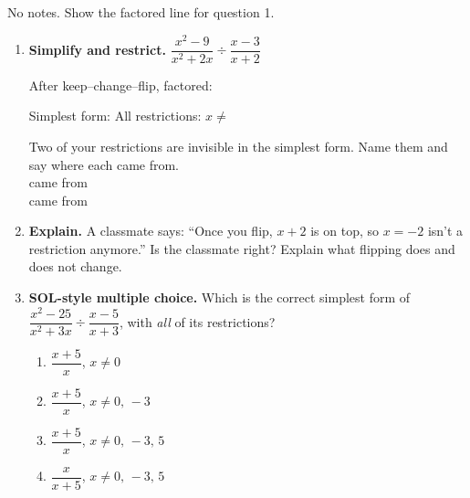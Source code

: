 \documentclass[10pt]{article}
\begin{document}
\namedateperiod

\vspace{0.08in}

No notes. Show the factored line for question 1.

\vspace{0.06in}

\begin{enumerate}[leftmargin=1.8em, itemsep=9pt]
  \item \textbf{Simplify and restrict.} \; $\dfrac{x^2-9}{x^2+2x}\div\dfrac{x-3}{x+2}$

        \vspace{4pt}
        After keep--change--flip, factored: \blank{5.0cm}

        \vspace{4pt}
        Simplest form: \blank{2.4cm} \quad All restrictions: $x\neq$ \blank{2.6cm}

        \vspace{4pt}
        Two of your restrictions are invisible in the simplest form. Name them and say where each
        came from. \\[3pt]
        \blank{3.2cm} came from \blank{4.2cm} \\[3pt]
        \blank{3.2cm} came from \blank{4.2cm}

  \item \textbf{Explain.} A classmate says: ``Once you flip, $x+2$ is on top, so $x=-2$ isn't a
        restriction anymore.'' Is the classmate right? Explain what flipping does and does not change.

  \item \textbf{SOL-style multiple choice.} Which is the correct simplest form of
        $\dfrac{x^2-25}{x^2+3x}\div\dfrac{x-5}{x+3}$, with \emph{all} of its restrictions?
        \begin{enumerate}[label=\Alph*., leftmargin=1.9em, itemsep=1pt]
          \item $\dfrac{x+5}{x}$, \; $x\neq0$
          \item $\dfrac{x+5}{x}$, \; $x\neq0,\,-3$
          \item $\dfrac{x+5}{x}$, \; $x\neq0,\,-3,\,5$
          \item $\dfrac{x}{x+5}$, \; $x\neq0,\,-3,\,5$
        \end{enumerate}
\end{enumerate}
\end{document}
